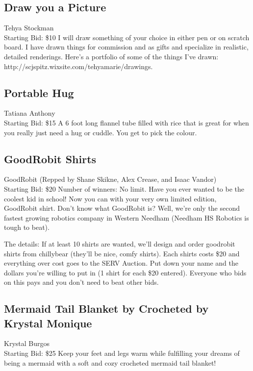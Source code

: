 \documentclass[11pt]{article}
\begin{document}
\subsection{Draw you a Picture}
Tehya Stockman
\\
Starting Bid: \$10
\newline
I will draw something of your choice in either pen or on scratch board. I have drawn things for commission and as gifts  and specialize in realistic, detailed renderings. Here's a portfolio of some of the things I've drawn: http://scjspitz.wixsite.com/tehyamarie/drawings.
\subsection{Portable Hug}
Tatiana Anthony
\\
Starting Bid: \$15
\newline
A 6 foot long flannel tube filled with rice that is great for when you really just need a hug or cuddle. You get to pick the colour.
\subsection{GoodRobit Shirts}
GoodRobit (Repped by Shane Skikne, Alex Crease, and Isaac Vandor)
\\
Starting Bid: \$20
\newline
Number of winners: No limit.
\newline
Have you ever wanted to be the coolest kid in school! Now you can with your very own limited edition, GoodRobit shirt. Don't know what GoodRobit is? Well, we're only the second fastest growing robotics company in Western Needham (Needham HS Robotics is tough to beat).

The details: If at least 10 shirts are wanted, we'll design and order goodrobit shirts from chillybear (they'll be nice, comfy shirts). Each shirts costs \$20 and everything over cost goes to the SERV Auction.  Put down your name and the dollars you're willing to put in (1 shirt for each \$20 entered). Everyone who bids on this pays and you don't need to beat other bids.
\subsection{Mermaid Tail Blanket by Crocheted by Krystal Monique}
Krystal Burgos
\\
Starting Bid: \$25
\newline
Keep your feet and legs warm while fulfilling your dreams of being a mermaid with  a soft and cozy crocheted mermaid tail blanket!
\end{document}
